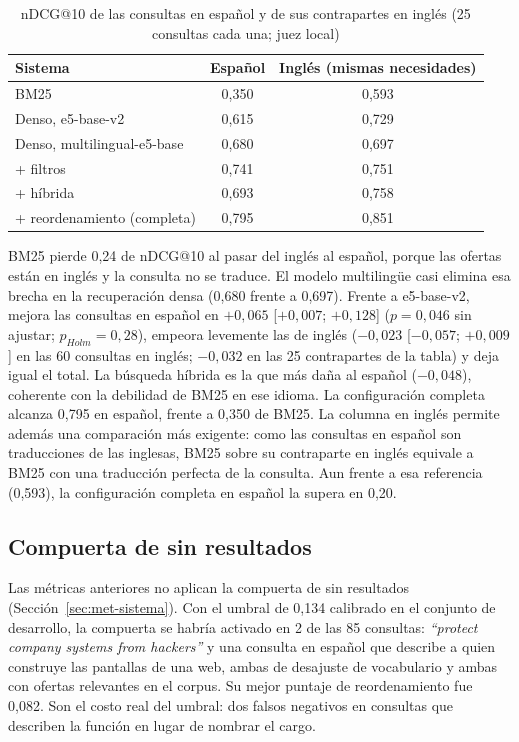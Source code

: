 \begin{table}[htbp!]
    \centering
    \caption{nDCG@10 de las consultas en español y de sus contrapartes en inglés (25 consultas cada una; juez local)}
    \label{tab:res-pe1-idioma}
    \begin{tabular}{|l|c|c|}
        \hline
        \textbf{Sistema} & \textbf{Español} & \textbf{Inglés (mismas necesidades)} \\
        \hline
        BM25 & 0{,}350 & 0{,}593 \\
        \hline
        Denso, e5-base-v2 & 0{,}615 & 0{,}729 \\
        \hline
        Denso, multilingual-e5-base & 0{,}680 & 0{,}697 \\
        \hline
        + filtros & 0{,}741 & 0{,}751 \\
        \hline
        + híbrida & 0{,}693 & 0{,}758 \\
        \hline
        + reordenamiento (completa) & 0{,}795 & 0{,}851 \\
        \hline
    \end{tabular}
\end{table}

BM25 pierde 0,24 de nDCG@10 al pasar del inglés al español, porque las ofertas están en inglés y la consulta no se traduce. El modelo multilingüe casi elimina esa brecha en la recuperación densa (0,680 frente a 0,697). Frente a e5-base-v2, mejora las consultas en español en $+0{,}065$ [$+0{,}007$; $+0{,}128$] ($p = 0{,}046$ sin ajustar; $p_{Holm} = 0{,}28$), empeora levemente las de inglés ($-0{,}023$ [$-0{,}057$; $+0{,}009$] en las 60 consultas en inglés; $-0{,}032$ en las 25 contrapartes de la tabla) y deja igual el total. La búsqueda híbrida es la que más daña al español ($-0{,}048$), coherente con la debilidad de BM25 en ese idioma. La configuración completa alcanza 0,795 en español, frente a 0,350 de BM25. La columna en inglés permite además una comparación más exigente: como las consultas en español son traducciones de las inglesas, BM25 sobre su contraparte en inglés equivale a BM25 con una traducción perfecta de la consulta. Aun frente a esa referencia (0,593), la configuración completa en español la supera en 0,20.

\subsection{Compuerta de sin resultados}

Las métricas anteriores no aplican la compuerta de sin resultados (Sección~\ref{sec:met-sistema}). Con el umbral de 0,134 calibrado en el conjunto de desarrollo, la compuerta se habría activado en 2 de las 85 consultas: \textit{\enquote{protect company systems from hackers}} y una consulta en español que describe a quien construye las pantallas de una web, ambas de desajuste de vocabulario y ambas con ofertas relevantes en el corpus. Su mejor puntaje de reordenamiento fue 0,082. Son el costo real del umbral: dos falsos negativos en consultas que describen la función en lugar de nombrar el cargo.

